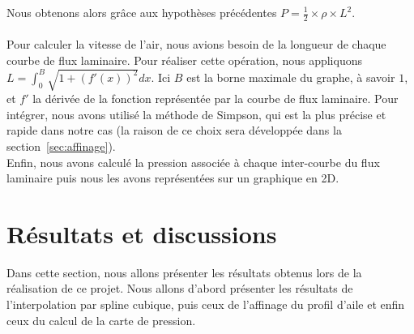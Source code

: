 \documentclass{article}
\begin{document}
Nous obtenons alors grâce aux hypothèses précédentes $P = \frac{1}{2} \times \rho \times L^2$.\\ \\
Pour calculer la vitesse de l'air, nous avions besoin de la longueur de chaque courbe de flux laminaire. Pour réaliser cette opération, nous appliquons $L = \int_{0}^{B} \sqrt{1 + (f'(x))^2} dx$. Ici $B$ est la borne maximale du graphe, à savoir $1$, et $f'$ la dérivée de la fonction représentée par la courbe de flux laminaire. Pour intégrer, nous avons utilisé la méthode de Simpson, qui est la plus précise et rapide dans notre cas (la raison de ce choix sera développée dans la section~\ref{sec:affinage}). \\
Enfin, nous avons calculé la pression associée à chaque inter-courbe du flux laminaire puis nous les avons représentées sur un graphique en 2D.
\section{Résultats et discussions}
Dans cette section, nous allons présenter les résultats obtenus lors de la réalisation de ce projet. Nous allons d'abord présenter les résultats de l'interpolation par spline cubique, puis ceux de l'affinage du profil d'aile et enfin ceux du calcul de la carte de pression.
\end{document}
